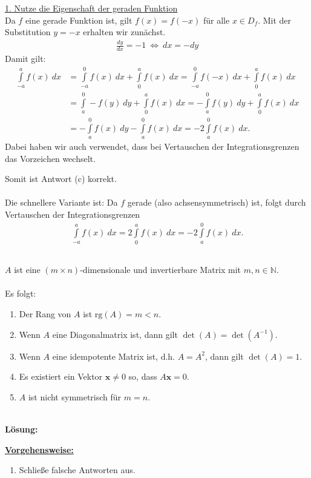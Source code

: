 \underline{1. Nutze die Eigenschaft der geraden Funktion }\\
Da $f$ eine gerade Funktion ist, gilt $f(x) = f(-x)$ für alle $x \in D_f$.
Mit der Substitution $y = -x $ erhalten wir zunächst.
\begin{align*}
	\frac{dy}{dx} = -1 
	\ \Leftrightarrow \
	dx = - dy
\end{align*}
Damit gilt:
\begin{align*}
	\int \limits_{- a}^a f(x) \ dx
	&=
	\int \limits_{-a}^0 f(x) \ dx
	+ 
	\int \limits_{0}^a f(x) \ dx
	=
	\int \limits_{-a}^0 f(-x) \ dx
	+ 
	\int \limits_{0}^a f(x) \ dx\\
	&=
	\int \limits_{a}^0 -f(y) \ dy
	+ 
	\int \limits_{0}^a f(x) \ dx
	=
	-\int \limits_{a}^0 f(y) \ dy
	+ 
	\int \limits_{0}^a f(x) \ dx\\
	&=
	-\int \limits_{a}^0 f(x) \ dy
	- 
	\int \limits_{a}^0 f(x) \ dx
	= 
	-2 
	\int \limits_{a}^0 f(x) \ dx.
\end{align*}
Dabei haben wir auch verwendet, dass bei Vertauschen der Integrationsgrenzen das Vorzeichen wechselt.

Somit ist Antwort (c) korrekt.\\
\\
Die schnellere Variante ist:
Da $f$ gerade (also achsensymmetrisch) ist, folgt durch Vertauschen der Integrationsgrenzen
\begin{align*}
	\int \limits_{- a}^a f(x) \ dx
	=
	2 \int \limits_{0}^a f(x) \ dx
	= 
	- 2 \int \limits_{a}^0 f(x) \ dx.
\end{align*}


\newpage
\subsection*{}
$A$ ist eine $(m \times n)$-dimensionale und invertierbare Matrix mit $m,n \in \mathbb{N}$.\\
\\
Es folgt:
\renewcommand{\labelenumi}{(\alph{enumi})}
\begin{enumerate}
	\item 
	Der Rang von $A$ ist $\mathrm{rg}(A) = m < n$.
	\item 
	Wenn $A$ eine Diagonalmatrix ist, dann gilt $\det(A) = \det(A^{-1})$.
	\item 
	Wenn $A$ eine idempotente Matrix ist, d.h. $A = A^2$, dann gilt $\det(A) = 1$.
	\item 
	Es existiert ein Vektor $\mathbf{x} \neq 0$ so, dass $A \mathbf{x} = 0$.
	\item 
	$A$ ist nicht symmetrisch  für $m=n$. 
\end{enumerate}
\ \\
\textbf{Lösung:}
\begin{mdframed}
\underline{\textbf{Vorgehensweise:}}
\renewcommand{\labelenumi}{\theenumi.}
\begin{enumerate}
\item Schließe falsche Antworten aus.
\end{enumerate}
\end{mdframed}

